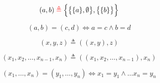 \begin{frame}{}
  \begin{definition}
    \[
      (a, b) \;\textcolor{red}{\triangleq}\; \Big\{\big\{\{a\}, \emptyset\big\}, \big\{\{b\}\big\}\Big\}
    \]
  \end{definition}


  \pause
  \begin{theorem}
    \[
      (a, b) = (c, d) \iff a = c \land b = d
    \]
  \end{theorem}
\end{frame}

\begin{frame}{}
  \begin{definition}
    \[
      (x, y, z) \triangleq ((x, y), z)
    \]

    \pause
    \[
      (x_{1}, x_{2}, \dots, x_{n-1}, x_{n})
        \triangleq ((x_{1}, x_{2}, \dots, x_{n-1}), x_{n})
    \]
  \end{definition}

  \pause
  \vspace{0.60cm}
  \begin{theorem}
    \[
      (x_{1}, \dots, x_{n}) = (y_{1}, \dots, y_{n})
      \iff x_{1} = y_{1} \land \dots x_{n} = y_{n}
    \]
  \end{theorem}
\end{frame}
